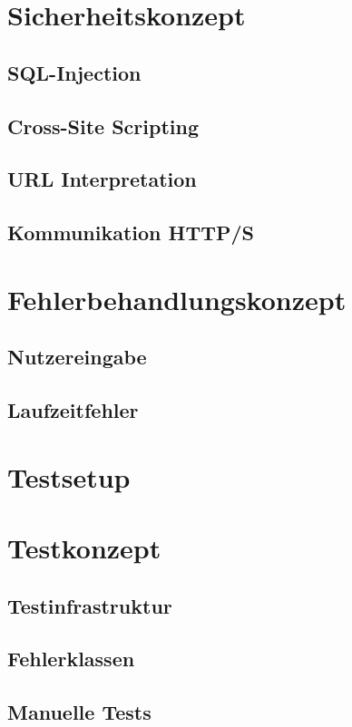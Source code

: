 \section{Sicherheitskonzept}
\subsection{SQL-Injection}
\subsection{Cross-Site Scripting}
\subsection{URL Interpretation}
\subsection{Kommunikation HTTP/S}

\section{Fehlerbehandlungskonzept}
\subsection{Nutzereingabe}
\subsection{Laufzeitfehler}

\section{Testsetup}

\section{Testkonzept}
\subsection{Testinfrastruktur}
\subsection{Fehlerklassen}
\subsection{Manuelle Tests}

